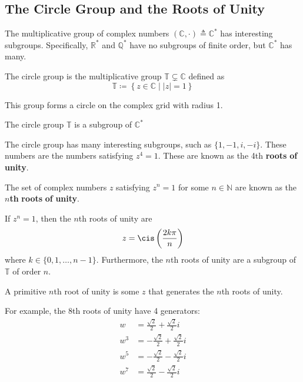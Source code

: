 \documentclass[12pt, letterpaper]{report}
\begin{document}
\subsection*{The Circle Group and the Roots of Unity}
The multiplicative group of complex numbers \((\mathbb{C} ,\cdot)\triangleq\mathbb{C} ^*\) has interesting subgroups. Specifically, \(\mathbb{R} ^*\) and \(\mathbb{Q} ^*\) have no subgroups of finite order, but \(\mathbb{C} ^*\) has many. 
\begin{definition}\label{circlegroup}
	The circle group is the multiplicative group \(\mathbb{T} \subsetneq \mathbb{C} \) defined as 
	\[
		\mathbb{T} \coloneqq \left\{ z\in\mathbb{C} \mid |z| = 1 \right\} 
	\]
\end{definition}
\begin{remark}
	This group forms a circle on the complex grid with radius 1.
\end{remark}
\begin{proposition}
	The circle group \(\mathbb{T} \) is a subgroup of \(\mathbb{C} ^*\) 
\end{proposition}
The circle group has many interesting subgroups, such as \(\{ 1,-1,i,-i \} \). These numbers are the numbers satisfying \(z^4 =1\). These are known as the 4th \textbf{roots} \textbf{of} \textbf{unity}. 
\begin{definition}
	The set of complex numbers \(z\) satisfying \(z^n =1\) for some \(n\in\mathbb{N} \) are known as the \(n\)\textbf{th} \textbf{roots} \textbf{of} \textbf{unity}.
\end{definition}
\begin{theorem}
	If \(z^n =1\), then the \(n\)th roots of unity are 
	\[z=\cis \left( \frac{2k \pi }{n} \right) \]
	where \(k\in\{ 0,1,\ldots,n-1 \} \). Furthermore, the \(n\)th roots of unity are a subgroup of \(\mathbb{T} \) of order \(n\).
\end{theorem}
\begin{definition}
	A primitive \(n\)th root of unity is some \(z\) that generates the \(n\)th roots of unity.
\end{definition}
For example, the 8th roots of unity have 4 generators: 
\begin{align*}
	w&=\frac{\sqrt{2} }{2}+\frac{\sqrt{2} }{2}i\\
	w^3 &=-\frac{\sqrt{2} }{2}+\frac{\sqrt{2} }{2}i\\
	w^5 &=-\frac{\sqrt{2} }{2} -\frac{\sqrt{2} }{2}i\\
	w^7 &=\frac{\sqrt{2} }{2}-\frac{\sqrt{2} }{2}i
\end{align*}
\end{document}
